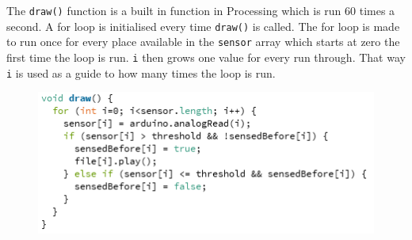 
  
The \texttt{draw()} function is a built in function in Processing which is run 60 times a second. A for loop is initialised every time \texttt{draw()} is called. The for loop is made to run once for every place available in the \texttt{sensor} array which starts at zero the first time the loop is run. \texttt{i} then grows one value for every run through. That way \texttt{i} is used as a guide to how many times the loop is run.

\begin{figure}[H]
\includegraphics[scale=0.8]{Figure/programkode04.png}
\end{figure}

